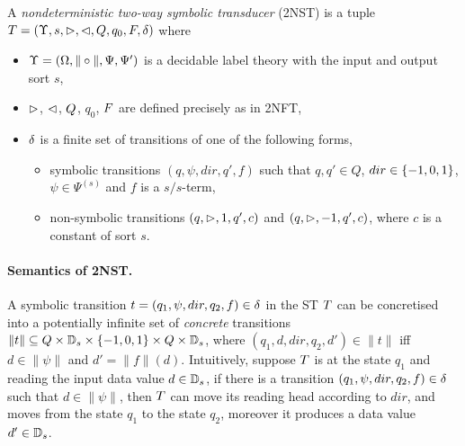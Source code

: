 \begin{definition}
    A \emph{nondeterministic two-way  symbolic \emph{transducer}} (2NST) is a tuple $T = (\Upsilon, s, \vartriangleright, \vartriangleleft, Q, q_0, F, \delta)$ where  
\begin{itemize}
\item $\Upsilon=(\Omega, \| \circ \|, \Psi, \Psi')$ is a decidable label theory with the input and output sort $s$,
%
\item $\vartriangleright$, $\vartriangleleft$, $Q$, $q_0$, $F$ are defined precisely as in 2NFT, 
%
\item $\delta$ is a finite set of  transitions of one of the following forms,
\begin{itemize}
\item symbolic transitions $(q, \psi, dir, q', f)$ such that $q, q' \in Q$, $dir \in \{-1, 0, 1\}$, $\psi \in \Psi^{(s)}$ and
$f$ is a $s /s$-term, 
\item non-symbolic transitions $(q, \vartriangleright, 1, q', c)$ and $(q, \vartriangleright, -1, q', c)$, where $c$ is a constant of sort $s$. 
\end{itemize}
\end{itemize}
\end{definition}

\paragraph{Semantics of 2NST.}
A symbolic transition $t=(q_1,\psi, dir, q_2, f) \in \delta$ in the ST $T$ can be concretised
into a potentially infinite set of \emph{concrete} transitions $\|t\| \subseteq Q \times \mathbb{D}_{s} \times \{-1, 0, 1\} \times Q \times \mathbb{D}_{s}$, where $(q_1, d, dir, q_2, d')  \in \|t\|$ iff $d \in \|\psi\|$ and $d' = \|f\|(d)$.
Intuitively, suppose $T$ is at the state $q_1$ and reading the input data value $d \in \mathbb{D}_{s}$,
if there is a transition $(q_1, \psi, dir, q_2, f )\in \delta$ such that $d \in \|\psi\|$, then $T$ can move its reading head according to $dir$, and moves from the state
$q_1$ to the state $q_2$, moreover it produces a data value $d' \in \mathbb{D}_{s}$.

